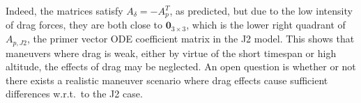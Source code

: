 Indeed, the matrices satisfy \(A_\delta = - A_p^T\), as predicted, but due to the low intensity of drag forces, they are both close to \(\mathbf{0}_{3\times 3}\), which is the lower right quadrant of \(A_{p, J2}\), the primer vector ODE coefficient matrix in the J2 model. This shows that maneuvers where drag is weak, either by virtue of the short timespan or high altitude, the effects of drag may be neglected. An open question is whether or not there exists a realistic maneuver scenario where drag effects cause sufficient differences w.r.t.\ to the J2 case.